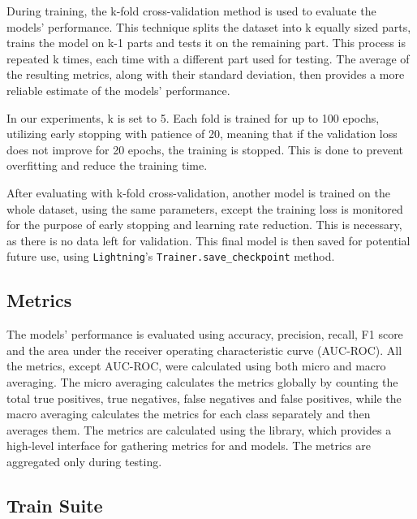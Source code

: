 \documentclass[english, he, bc, kiv, iso690alph, viewonly]{fasthesis}
\begin{document}
During training, the k-fold cross-validation method is used to evaluate the models' performance. This technique splits the dataset into k equally sized parts, trains the model on k-1 parts and tests it on the remaining part. This process is repeated k times, each time with a different part used for testing. The average of the resulting metrics, along with their standard deviation, then provides a more reliable estimate of the models' performance.

In our experiments, k is set to 5. Each fold is trained for up to 100 epochs, utilizing early stopping with patience of 20, meaning that if the validation loss does not improve for 20 epochs, the training is stopped. This is done to prevent overfitting and reduce the training time.

After evaluating with k-fold cross-validation, another model is trained on the whole dataset, using the same parameters, except the training loss is monitored for the purpose of early stopping and learning rate reduction. This is necessary, as there is no data left for validation. This final model is then saved for potential future use, using \texttt{Lightning}'s \texttt{Trainer.save\_checkpoint} method.

\subsection{Metrics}

The models' performance is evaluated using accuracy, precision, recall, F1 score and the area under the receiver operating characteristic curve (AUC-ROC). All the metrics, except AUC-ROC, were calculated using both micro and macro averaging. The micro averaging calculates the metrics globally by counting the total true positives, true negatives, false negatives and false positives, while the macro averaging calculates the metrics for each class separately and then averages them.
The metrics are calculated using the  library, which provides a high-level interface for gathering metrics for  and  models. The metrics are aggregated only during testing.

\subsection{Train Suite}
\end{document}
